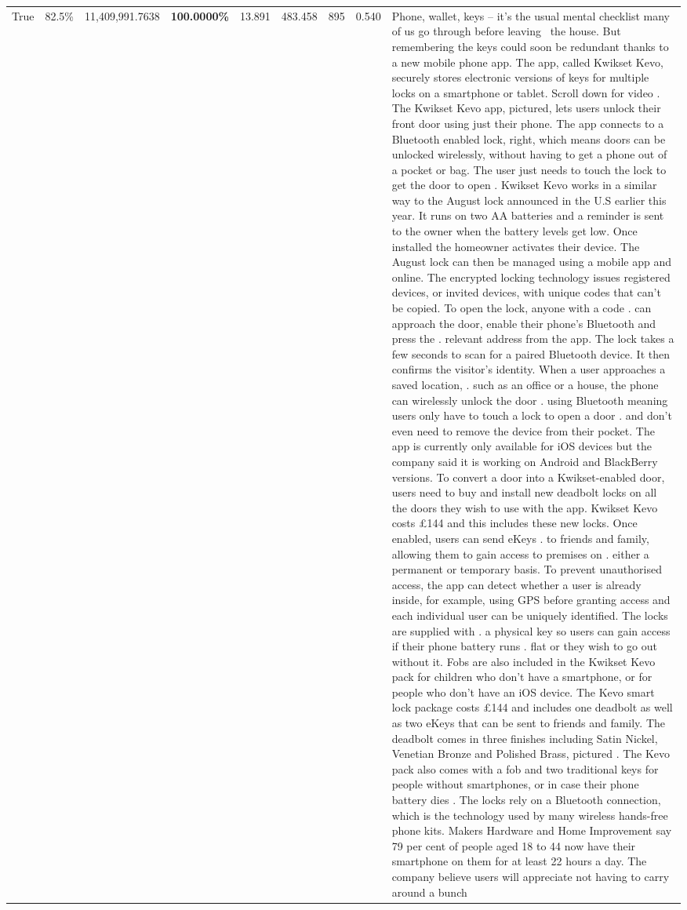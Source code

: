 \begin{table}[H]
\begin{tabular}{lllrlllll}
True & 82.5\% & 11,409,991.7638 & \bfseries \color{red} 100.0000\% & 13.891 & 483.458 & 895 & 0.540 & Phone, wallet, keys – it’s the usual mental checklist many of us go through before leaving  the house. But remembering the keys could soon be redundant thanks to a new mobile phone app. The app, called Kwikset Kevo, securely stores electronic versions of keys for multiple locks on a smartphone or tablet. Scroll down for video . The Kwikset Kevo app, pictured, lets users unlock their front door using just their phone. The app connects to a Bluetooth enabled lock, right, which means doors can be unlocked wirelessly, without having to get a phone out of a pocket or bag. The user just needs to touch the lock to get the door to open . Kwikset Kevo works in a similar way to the August lock announced in the U.S earlier this year. It runs on two AA batteries and a reminder is sent to the owner when the battery levels get low. Once installed the homeowner activates their device. The August lock can then be managed using a mobile app and online. The encrypted locking technology issues registered devices, or invited devices, with unique codes that can't be copied. To open the lock, anyone with a code . can approach the door, enable their phone's Bluetooth and press the . relevant address from the app. The lock takes a few seconds to scan for a paired Bluetooth device. It then confirms the visitor's identity. When a user approaches a saved location, . such as an office or a house, the phone can wirelessly unlock the door . using Bluetooth meaning users only have to touch a lock to open a door . and don't even need to remove the device from their pocket. The app is currently only available for iOS devices but the company said it is working on Android and BlackBerry versions. To convert a door into a Kwikset-enabled door, users need to buy and install new deadbolt locks on all the doors they wish to use with the app. Kwikset Kevo costs £144 and this includes these new locks. Once enabled, users can send eKeys . to friends and family, allowing them to gain access to premises on . either a permanent or temporary basis. To prevent unauthorised access, the app can detect whether a user is already inside, for example, using GPS before granting access and each individual user can be uniquely identified. The locks are supplied with . a physical key so users can gain access if their phone battery runs . flat or they wish to go out without it. Fobs are also included in the Kwikset Kevo pack for children who don't have a smartphone, or for people who don't have an iOS device. The Kevo smart lock package costs £144 and includes one deadbolt as well as two eKeys that can be sent to friends and family. The deadbolt comes in three finishes including Satin Nickel, Venetian Bronze and Polished Brass, pictured . The Kevo pack also comes with a fob and two traditional keys for people without smartphones, or in case their phone battery dies . The locks rely on a Bluetooth connection, which is the technology used by many wireless hands-free phone kits. Makers Hardware and Home Improvement say 79 per cent of people aged 18 to 44 now have their smartphone on them for at least 22 hours a day. The company believe users will appreciate not having to carry around a bunch 
\end{tabular}
\end{table}
